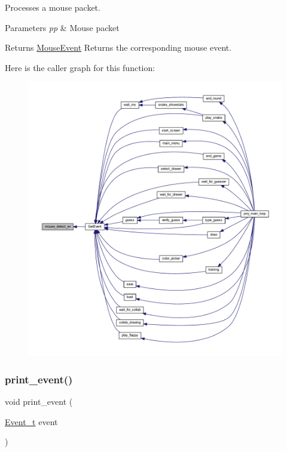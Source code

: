 Processes a mouse packet. 


\begin{DoxyParams}{Parameters}
{\em pp} & Mouse packet \\
\hline
\end{DoxyParams}
\begin{DoxyReturn}{Returns}
\mbox{\hyperlink{struct_mouse_event}{Mouse\+Event}} Returns the corresponding mouse event. 
\end{DoxyReturn}
Here is the caller graph for this function\+:\nopagebreak
\begin{figure}[H]
\begin{center}
\leavevmode
\includegraphics[width=350pt]{group__event_ga556d3da45a1dc6de5d205d92b4b275b3_icgraph}
\end{center}
\end{figure}
\mbox{\label{group__event_gad74e39179573fc99ba50e3dddef67ac5}} 
\subsubsection{\texorpdfstring{print\+\_\+event()}{print\_event()}}
{\footnotesize\ttfamily void print\+\_\+event (\begin{DoxyParamCaption}\item[{\mbox{\hyperlink{struct_event__t}{Event\+\_\+t}}}]{event }\end{DoxyParamCaption})}



